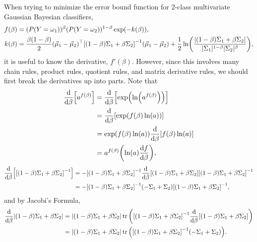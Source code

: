 \documentclass[headings=optiontoheadandtoc,listof=totoc,parskip=full]{scrartcl}
\begin{document}
When trying to minimize the error bound function for 2-class multivariate Gaussian Bayesian classifiers,
\begin{equation}
	\begin{split}
		f(\beta) &= (P(Y = \omega_1))^\beta(P(Y = \omega_2))^{1 - \beta}\exp(-k(\beta)),\\
		k(\beta) &= \frac{\beta(1 - \beta)}{2}(\vec\mu_1 - \vec\mu_2)^\top \qty[(1 - \beta)\Sigma_1 + \beta\Sigma_2]^{-1}(\vec\mu_1 - \vec\mu_2) + \frac{1}{2}\ln(\frac{|(1 - \beta)\Sigma_1 + \beta\Sigma_2|}{|\Sigma_1|^{1 - \beta}|\Sigma_2|^\beta}),
	\end{split}
	\label{eq:error-bound-func}
\end{equation}
it is useful to know the derivative, $f'(\beta)$. However, since this involves many chain rules, product rules, quotient rules, and matrix derivative rules, we should first break the derivatives up into parts. Note that
\begin{equation}
	\begin{split}
		\dv{\beta}\qty[a^{f(\beta)}] &= \dv{\beta}\qty[\exp(\ln(a^{f(\beta)}))]\\
			&= \dv{\beta}\qty[\exp(f(\beta)\ln(a))]\\
			&= \exp(f(\beta)\ln(a)) \dv{\beta}\qty[f(\beta)\ln(a)]\\
			&= a^{f(\beta)} \qty(\ln(a) \dv{f}{\beta}), \label{eq:diff-exp}
	\end{split}
\end{equation}
\begin{equation}
	\begin{split}
		\dv{\beta}\qty[\qty[(1 - \beta)\Sigma_1 + \beta\Sigma_2]^{-1}] &= - \qty[(1 - \beta)\Sigma_1 + \beta\Sigma_2]^{-1} \dv{\beta}\qty[(1 - \beta)\Sigma_1 + \beta\Sigma_2] \qty[(1 - \beta)\Sigma_1 + \beta\Sigma_2]^{-1}\\
			&= - \qty[(1 - \beta)\Sigma_1 + \beta\Sigma_2]^{-1} \qty(-\Sigma_1 + \Sigma_2) \qty[(1 - \beta)\Sigma_1 + \beta\Sigma_2]^{-1},\label{eq:diff-inverse}
	\end{split}
\end{equation}
and by Jacobi's Formula,
\begin{equation}
	\begin{split}
		\dv{\beta} |(1 - \beta)\Sigma_1 + \beta\Sigma_2| &= |(1 - \beta)\Sigma_1 + \beta\Sigma_2| \tr \qty(\qty[(1 - \beta)\Sigma_1 + \beta\Sigma_2]^{-1} \dv{\beta} \qty[(1 - \beta)\Sigma_1 + \beta\Sigma_2])\\
			&= |(1 - \beta)\Sigma_1 + \beta\Sigma_2| \tr \qty(\qty[(1 - \beta)\Sigma_1 + \beta\Sigma_2]^{-1} \qty(-\Sigma_1 + \Sigma_2)). \label{eq:diff-det}
	\end{split}
\end{equation}
\end{document}
